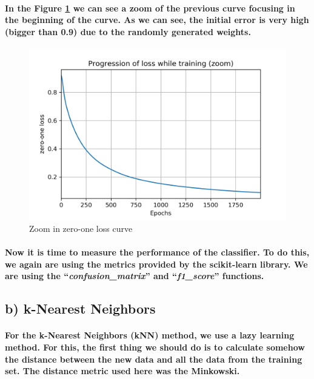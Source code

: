 \documentclass[a4paper]{article}    %
\begin{document}
\paragraph{In the Figure \ref{fig:ex2-a-zero_one_loss_zoom} we can see a zoom of the previous curve focusing in the beginning of the curve. As we can see, the initial error is very high (bigger than 0.9) due to the randomly generated weights.}

\begin{figure}[H]
    \centering
    \includegraphics[width=12cm]{zero_one_loss_zoom}
    \caption{Zoom in zero-one loss curve}
    \label{fig:ex2-a-zero_one_loss_zoom}
\end{figure}

\paragraph{Now it is time to measure the performance of the classifier. To do this, we again are using the metrics provided by the scikit-learn library. We are using the ``\textit{confusion\_matrix}'' and ``\textit{f1\_score}'' functions.}








\subsection{b) k-Nearest Neighbors}

\paragraph{For the k-Nearest Neighbors (kNN) method, we use a lazy learning method. For this, the first thing we should do is to calculate somehow the distance between the new data and all the data from the training set. The distance metric used here was the Minkowski.}
\end{document}
